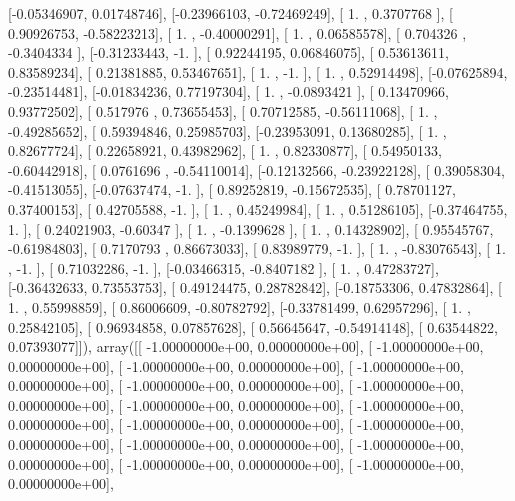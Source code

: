 \documentclass{article}
\begin{document}
       [-0.05346907,  0.01748746],
       [-0.23966103, -0.72469249],
       [ 1.        ,  0.3707768 ],
       [ 0.90926753, -0.58223213],
       [ 1.        , -0.40000291],
       [ 1.        ,  0.06585578],
       [ 0.704326  , -0.3404334 ],
       [-0.31233443, -1.        ],
       [ 0.92244195,  0.06846075],
       [ 0.53613611,  0.83589234],
       [ 0.21381885,  0.53467651],
       [ 1.        , -1.        ],
       [ 1.        ,  0.52914498],
       [-0.07625894, -0.23514481],
       [-0.01834236,  0.77197304],
       [ 1.        , -0.0893421 ],
       [ 0.13470966,  0.93772502],
       [ 0.517976  ,  0.73655453],
       [ 0.70712585, -0.56111068],
       [ 1.        , -0.49285652],
       [ 0.59394846,  0.25985703],
       [-0.23953091,  0.13680285],
       [ 1.        ,  0.82677724],
       [ 0.22658921,  0.43982962],
       [ 1.        ,  0.82330877],
       [ 0.54950133, -0.60442918],
       [ 0.0761696 , -0.54110014],
       [-0.12132566, -0.23922128],
       [ 0.39058304, -0.41513055],
       [-0.07637474, -1.        ],
       [ 0.89252819, -0.15672535],
       [ 0.78701127,  0.37400153],
       [ 0.42705588, -1.        ],
       [ 1.        ,  0.45249984],
       [ 1.        ,  0.51286105],
       [-0.37464755,  1.        ],
       [ 0.24021903, -0.60347   ],
       [ 1.        , -0.1399628 ],
       [ 1.        ,  0.14328902],
       [ 0.95545767, -0.61984803],
       [ 0.7170793 ,  0.86673033],
       [ 0.83989779, -1.        ],
       [ 1.        , -0.83076543],
       [ 1.        , -1.        ],
       [ 0.71032286, -1.        ],
       [-0.03466315, -0.8407182 ],
       [ 1.        ,  0.47283727],
       [-0.36432633,  0.73553753],
       [ 0.49124475,  0.28782842],
       [-0.18753306,  0.47832864],
       [ 1.        ,  0.55998859],
       [ 0.86006609, -0.80782792],
       [-0.33781499,  0.62957296],
       [ 1.        ,  0.25842105],
       [ 0.96934858,  0.07857628],
       [ 0.56645647, -0.54914148],
       [ 0.63544822,  0.07393077]]), array([[ -1.00000000e+00,   0.00000000e+00],
       [ -1.00000000e+00,   0.00000000e+00],
       [ -1.00000000e+00,   0.00000000e+00],
       [ -1.00000000e+00,   0.00000000e+00],
       [ -1.00000000e+00,   0.00000000e+00],
       [ -1.00000000e+00,   0.00000000e+00],
       [ -1.00000000e+00,   0.00000000e+00],
       [ -1.00000000e+00,   0.00000000e+00],
       [ -1.00000000e+00,   0.00000000e+00],
       [ -1.00000000e+00,   0.00000000e+00],
       [ -1.00000000e+00,   0.00000000e+00],
       [ -1.00000000e+00,   0.00000000e+00],
       [ -1.00000000e+00,   0.00000000e+00],
       [ -1.00000000e+00,   0.00000000e+00],
\end{document}
